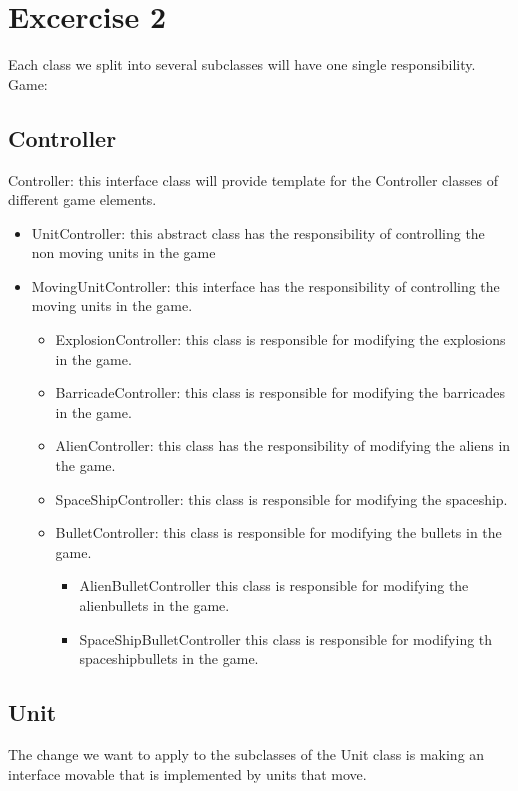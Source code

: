 \documentclass[10pt]{article}
\begin{document}
\section*{Excercise 2}
Each class we split into several subclasses will have one single responsibility. \\
Game:
\subsection*{Controller}
Controller: this interface class will provide template for the Controller classes of different game elements. 
	\begin{itemize}
	\item UnitController: this abstract class has the responsibility of controlling the non moving units in the game
	\item MovingUnitController: this interface has the responsibility of controlling the moving units in the game. 
		\begin{itemize}
			\item ExplosionController: this class is responsible for modifying the explosions in the game.
			\item BarricadeController: this class is responsible for modifying the 	barricades in the game.
			\item AlienController: this class has the responsibility of modifying the aliens in the game.
			\item SpaceShipController: this class is responsible for modifying the spaceship.
			\item BulletController: this class is responsible for modifying the bullets in the game.
			\begin{itemize}
				\item AlienBulletController this class is responsible for modifying the alienbullets in the game.
				\item SpaceShipBulletController this class is responsible for modifying th spaceshipbullets in the game.
			\end{itemize}
		\end{itemize}
	\end{itemize}
\subsection*{Unit}
The change we want to apply to the subclasses of the Unit class is making an interface movable that is implemented by units that move.
\end{document}
